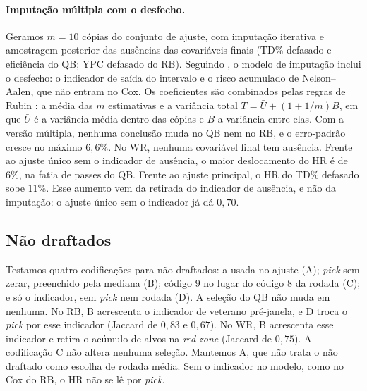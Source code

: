 \paragraph{Imputação múltipla com o desfecho.}
Geramos $m = 10$ cópias do conjunto de ajuste, com imputação iterativa e amostragem posterior das ausências das covariáveis finais (TD\% defasado e eficiência do QB; YPC defasado do RB). Seguindo \citet{white2009}, o modelo de imputação inclui o desfecho: o indicador de saída do intervalo e o risco acumulado de Nelson--Aalen, que não entram no Cox. Os coeficientes são combinados pelas regras de Rubin \citep{rubin1987}: a média das $m$ estimativas e a variância total $T = \bar{U} + (1 + 1/m)B$, em que $\bar{U}$ é a variância média dentro das cópias e $B$ a variância entre elas. Com a versão múltipla, nenhuma conclusão muda no QB nem no RB, e o erro-padrão cresce no máximo $6{,}6\%$. No WR, nenhuma covariável final tem ausência. Frente ao ajuste único sem o indicador de ausência, o maior deslocamento do HR é de $6\%$, na fatia de passes do QB. Frente ao ajuste principal, o HR do TD\% defasado sobe $11\%$. Esse aumento vem da retirada do indicador de ausência, e não da imputação: o ajuste único sem o indicador já dá $0{,}70$.

\subsection{Não draftados}
\label{apx:undrafted}

Testamos quatro codificações para não draftados: a usada no ajuste (A); \textit{pick} sem zerar, preenchido pela mediana (B); código $9$ no lugar do código $8$ da rodada (C); e só o indicador, sem \textit{pick} nem rodada (D). A seleção do QB não muda em nenhuma. No RB, B acrescenta o indicador de veterano pré-janela, e D troca o \textit{pick} por esse indicador (Jaccard de $0{,}83$ e $0{,}67$). No WR, B acrescenta esse indicador e retira o acúmulo de alvos na \textit{red zone} (Jaccard de $0{,}75$). A codificação C não altera nenhuma seleção. Mantemos A, que não trata o não draftado como escolha de rodada média. Sem o indicador no modelo, como no Cox do RB, o HR não se lê por \textit{pick}.
